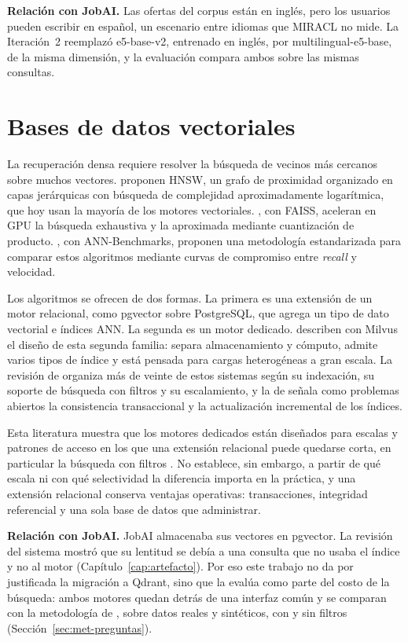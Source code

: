 \textbf{Relación con JobAI.} Las ofertas del corpus están en inglés, pero los usuarios pueden escribir en español, un escenario entre idiomas que MIRACL no mide. La Iteración~2 reemplazó e5-base-v2, entrenado en inglés, por multilingual-e5-base, de la misma dimensión, y la evaluación compara ambos sobre las mismas consultas.

\section{Bases de datos vectoriales}
\label{sec:estado-arte-vectordb}

La recuperación densa requiere resolver la búsqueda de vecinos más cercanos sobre muchos vectores. \citet{Malkov2020} proponen HNSW, un grafo de proximidad organizado en capas jerárquicas con búsqueda de complejidad aproximadamente logarítmica, que hoy usan la mayoría de los motores vectoriales. \citet{Johnson2019}, con FAISS, aceleran en GPU la búsqueda exhaustiva y la aproximada mediante cuantización de producto. \citet{Aumuller2020}, con ANN-Benchmarks, proponen una metodología estandarizada para comparar estos algoritmos mediante curvas de compromiso entre \textit{recall} y velocidad.

Los algoritmos se ofrecen de dos formas. La primera es una extensión de un motor relacional, como pgvector sobre PostgreSQL, que agrega un tipo de dato vectorial e índices ANN. La segunda es un motor dedicado. \citet{Wang2021} describen con Milvus el diseño de esta segunda familia: separa almacenamiento y cómputo, admite varios tipos de índice y está pensada para cargas heterogéneas a gran escala. La revisión de \citet{Pan2024} organiza más de veinte de estos sistemas según su indexación, su soporte de búsqueda con filtros y su escalamiento, y la de \citet{Taipalus2024} señala como problemas abiertos la consistencia transaccional y la actualización incremental de los índices.

Esta literatura muestra que los motores dedicados están diseñados para escalas y patrones de acceso en los que una extensión relacional puede quedarse corta, en particular la búsqueda con filtros \citep{Sanca2024}. No establece, sin embargo, a partir de qué escala ni con qué selectividad la diferencia importa en la práctica, y una extensión relacional conserva ventajas operativas: transacciones, integridad referencial y una sola base de datos que administrar.

\textbf{Relación con JobAI.} JobAI almacenaba sus vectores en pgvector. La revisión del sistema mostró que su lentitud se debía a una consulta que no usaba el índice y no al motor (Capítulo~\ref{cap:artefacto}). Por eso este trabajo no da por justificada la migración a Qdrant, sino que la evalúa como parte del costo de la búsqueda: ambos motores quedan detrás de una interfaz común y se comparan con la metodología de \citet{Aumuller2020}, sobre datos reales y sintéticos, con y sin filtros (Sección~\ref{sec:met-preguntas}).

